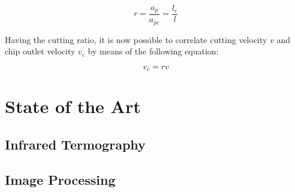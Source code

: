 	\begin{equation} 
	\label{}
	r = \frac{a_{p}}{a_{pc}} = \frac{l_{c}}{l}
	\end{equation}

	Having the cutting ratio, it is now possible to correlate cutting velocity $v$ and chip outlet velocity $v_{c}$ by means of the following equation:

	\begin{equation} 
	\label{}
	v_{c} = rv
	\end{equation}

\section{State of the Art}

\subsection{Infrared Termography}
	\label{sec:infrared}

\subsection{Image Processing}
	
